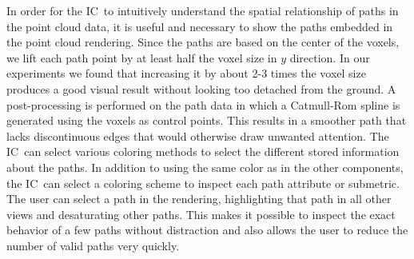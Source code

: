 \documentclass[conference,10pt,letter]{IEEEtran}
\def\IC{IC}
\begin{document}
%
%
 In order for the \IC\ to intuitively understand the spatial relationship of paths in the point cloud data, it is useful and necessary to show the paths embedded in the point cloud rendering. Since the paths are based on the center of the voxels, we lift each path point by at least half the voxel size in $y$ direction. In our experiments we found that increasing it by about 2-3 times the voxel size produces a good visual result without looking too detached from the ground. A post-processing is performed on the path data in which a Catmull-Rom spline is generated using the voxels as control points. This results in a smoother path that lacks discontinuous edges that would otherwise draw unwanted attention. The \IC\ can select various coloring methods to select the different stored information about the paths. In addition to using the same color as in the other components, the \IC\ can select a coloring scheme to inspect each path attribute or submetric. The user can select a path in the rendering, highlighting that path in all other views and desaturating other paths. This makes it possible to inspect the exact behavior of a few paths without distraction and also allows the user to reduce the number of valid paths very quickly.
%
\end{document}
